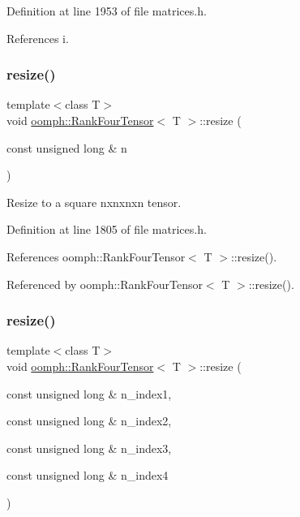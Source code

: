 Definition at line 1953 of file matrices.\+h.



References i.

\mbox{\label{classoomph_1_1RankFourTensor_af70b319deb21a179326460b41def5aff}} 
\subsubsection{\texorpdfstring{resize()}{resize()}\hspace{0.1cm}{\footnotesize\ttfamily [1/3]}}
{\footnotesize\ttfamily template$<$class T$>$ \\
void \hyperlink{classoomph_1_1RankFourTensor}{oomph\+::\+Rank\+Four\+Tensor}$<$ T $>$\+::resize (\begin{DoxyParamCaption}\item[{const unsigned long \&}]{n }\end{DoxyParamCaption})\hspace{0.3cm}{\ttfamily [inline]}}



Resize to a square nxnxnxn tensor. 



Definition at line 1805 of file matrices.\+h.



References oomph\+::\+Rank\+Four\+Tensor$<$ T $>$\+::resize().



Referenced by oomph\+::\+Rank\+Four\+Tensor$<$ T $>$\+::resize().

\mbox{\label{classoomph_1_1RankFourTensor_a57fbad42c64d5e452851730e64a2dfcf}} 
\subsubsection{\texorpdfstring{resize()}{resize()}\hspace{0.1cm}{\footnotesize\ttfamily [2/3]}}
{\footnotesize\ttfamily template$<$class T$>$ \\
void \hyperlink{classoomph_1_1RankFourTensor}{oomph\+::\+Rank\+Four\+Tensor}$<$ T $>$\+::resize (\begin{DoxyParamCaption}\item[{const unsigned long \&}]{n\+\_\+index1,  }\item[{const unsigned long \&}]{n\+\_\+index2,  }\item[{const unsigned long \&}]{n\+\_\+index3,  }\item[{const unsigned long \&}]{n\+\_\+index4 }\end{DoxyParamCaption})\hspace{0.3cm}{\ttfamily [inline]}}



